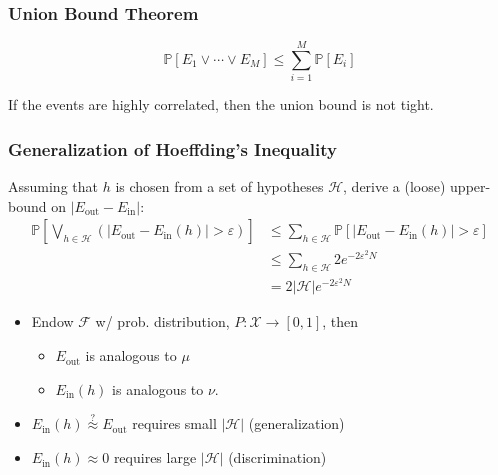 \subsubsection{Union Bound Theorem}
\begin{theorem}
    \begin{equation*}
        \mathbb{P} \left[E_1 \lor \cdots \lor E_M \right] \leq \sum_{i=1}^{M} \mathbb{P}[E_i]
    \end{equation*}
\end{theorem}

\begin{warning}
    If the events are highly correlated, then the union bound is not tight.
\end{warning}

\subsubsection{Generalization of Hoeffding's Inequality}
\begin{definition}
    Assuming that $h$ is chosen from a set of hypotheses $\mathcal{H}$, derive a (loose) upper-bound on $|E_{\text{out}} - E_{\text{in}}|$:
    \begin{align*}
        \mathbb{P} \left[ \bigvee_{h \in \mathcal{H}} \left( |E_{\text{out}} - E_{\text{in}}(h)| > \varepsilon \right) \right]
        &\leq \sum_{h \in \mathcal{H}} \mathbb{P} \left[ |E_{\text{out}} - E_{\text{in}}(h)| > \varepsilon \right] \\
        &\leq \sum_{h \in \mathcal{H}} 2e^{-2\varepsilon^2 N} \\
        &= 2 |\mathcal{H}| e^{-2\varepsilon^2 N} 
    \end{align*}
    \begin{itemize}
        \item Endow $\mathcal{F}$ w/ prob. distribution, $P : \mathcal{X} \to [0,1]$, then 
        \begin{itemize}
            \item $E_{\text{out}}$ is analogous to $\mu$ 
            \item $E_{\text{in}}(h)$ is analogous to $\nu$. 
        \end{itemize}
    \end{itemize}
\end{definition}

\begin{notes}
    \begin{itemize}
        \item $E_{\text{in}}(h) \stackrel{?}{\approx} E_{\text{out}}$ requires small $|\mathcal{H}|$ (generalization)
        \item $E_{\text{in}}(h) \approx 0$ requires large $|\mathcal{H}|$ (discrimination)
    \end{itemize}
\end{notes}

